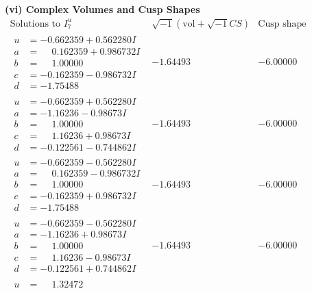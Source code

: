 \documentclass[1p]{elsarticle_modified}
\theoremstyle{definition}
\newcommand{\I}{\sqrt{-1}}
\begin{document}
\newpage\flushleft \textbf{(vi) Complex Volumes and Cusp Shapes}
$$\begin{array}{c|c|c}  
\text{Solutions to }I^u_{7}& \I (\text{vol} + \sqrt{-1}CS) & \text{Cusp shape}\\
 \hline 
\begin{aligned}
u &= -0.662359 + 0.562280 I \\
a &= \phantom{-}0.162359 + 0.986732 I \\
b &= \phantom{-}1.00000\phantom{ +0.000000I} \\
c &= -0.162359 - 0.986732 I \\
d &= -1.75488\phantom{ +0.000000I}\end{aligned}
 & -1.64493\phantom{ +0.000000I} & -6.00000\phantom{ +0.000000I} \\ \hline\begin{aligned}
u &= -0.662359 + 0.562280 I \\
a &= -1.16236 - 0.98673 I \\
b &= \phantom{-}1.00000\phantom{ +0.000000I} \\
c &= \phantom{-}1.16236 + 0.98673 I \\
d &= -0.122561 - 0.744862 I\end{aligned}
 & -1.64493\phantom{ +0.000000I} & -6.00000\phantom{ +0.000000I} \\ \hline\begin{aligned}
u &= -0.662359 - 0.562280 I \\
a &= \phantom{-}0.162359 - 0.986732 I \\
b &= \phantom{-}1.00000\phantom{ +0.000000I} \\
c &= -0.162359 + 0.986732 I \\
d &= -1.75488\phantom{ +0.000000I}\end{aligned}
 & -1.64493\phantom{ +0.000000I} & -6.00000\phantom{ +0.000000I} \\ \hline\begin{aligned}
u &= -0.662359 - 0.562280 I \\
a &= -1.16236 + 0.98673 I \\
b &= \phantom{-}1.00000\phantom{ +0.000000I} \\
c &= \phantom{-}1.16236 - 0.98673 I \\
d &= -0.122561 + 0.744862 I\end{aligned}
 & -1.64493\phantom{ +0.000000I} & -6.00000\phantom{ +0.000000I} \\ \hline\begin{aligned}
u &= \phantom{-}1.32472\phantom{ +0.000000I} \\

\end{aligned}
\end{array}$$
\end{document}
